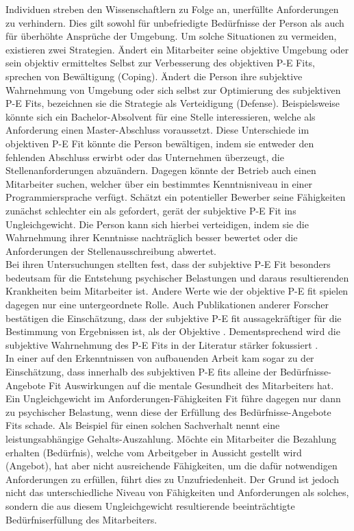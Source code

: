 Individuen streben den Wissenschaftlern zu Folge an, unerfüllte Anforderungen zu verhindern. Dies gilt sowohl für unbefriedigte Bedürfnisse der Person als auch für überhöhte Ansprüche der Umgebung. Um solche Situationen zu vermeiden, existieren zwei Strategien. Ändert ein Mitarbeiter seine objektive Umgebung oder sein objektiv ermitteltes Selbst zur Verbesserung des objektiven P-E Fits, sprechen \textcite{copingAndAdaption:1974} von Bewältigung (Coping). Ändert die Person ihre subjektive Wahrnehmung von Umgebung oder sich selbst zur Optimierung des subjektiven P-E Fits, bezeichnen sie die Strategie als Verteidigung (Defense). Beispielsweise könnte sich ein Bachelor-Absolvent für eine Stelle interessieren, welche als Anforderung einen Master-Abschluss voraussetzt. Diese Unterschiede im objektiven P-E Fit könnte die Person bewältigen, indem sie entweder den fehlenden Abschluss erwirbt oder das Unternehmen überzeugt, die Stellenanforderungen abzuändern. Dagegen könnte der Betrieb auch einen Mitarbeiter suchen, welcher über ein bestimmtes Kenntnisniveau in einer Programmiersprache verfügt. Schätzt ein potentieller Bewerber seine Fähigkeiten zunächst schlechter ein als gefordert, gerät der subjektive P-E Fit ins Ungleichgewicht. Die Person kann sich hierbei verteidigen, indem sie die Wahrnehmung ihrer Kenntnisse nachträglich besser bewertet oder die Anforderungen der Stellenausschreibung abwertet.\\
Bei ihren Untersuchungen stellten \textcite{copingAndAdaption:1974} fest, dass der subjektive P-E Fit besonders bedeutsam für die Entstehung psychischer Belastungen und daraus resultierenden Krankheiten beim Mitarbeiter ist. Andere Werte wie der objektive P-E fit spielen dagegen nur eine untergeordnete Rolle. Auch Publikationen anderer Forscher bestätigen die Einschätzung, dass der subjektive P-E fit aussagekräftiger für die Bestimmung von Ergebnissen ist, als der Objektive \cite[S. 3]{carless:2005}. Dementsprechend wird die subjektive Wahrnehmung des P-E Fits in der Literatur stärker fokussiert \cite[S. 8]{caplan:1987}\cite[S. 9]{caplan:1993}\cite[S. 16]{choi:2004}.\\
In einer auf den Erkenntnissen von \textcite{copingAndAdaption:1974} aufbauenden Arbeit kam \textcite{harrison:1978} sogar zu der Einschätzung, dass innerhalb des subjektiven P-E fits alleine der Bedürfnisse-Angebote Fit Auswirkungen auf die mentale Gesundheit des Mitarbeiters hat. Ein Ungleichgewicht im Anforderungen-Fähigkeiten Fit führe dagegen nur dann zu psychischer Belastung, wenn diese der Erfüllung des Bedürfnisse-Angebote Fits schade. Als Beispiel für einen solchen Sachverhalt nennt \textcite{harrison:1978} eine leistungsabhängige Gehalts-Auszahlung. Möchte ein Mitarbeiter die Bezahlung erhalten (Bedürfnis), welche vom Arbeitgeber in Aussicht gestellt wird (Angebot), hat aber nicht ausreichende Fähigkeiten, um die dafür notwendigen Anforderungen zu erfüllen, führt dies zu Unzufriedenheit. Der Grund ist jedoch nicht das unterschiedliche Niveau von Fähigkeiten und Anforderungen als solches, sondern die aus diesem Ungleichgewicht resultierende beeinträchtigte Bedürfniserfüllung des Mitarbeiters.\\
